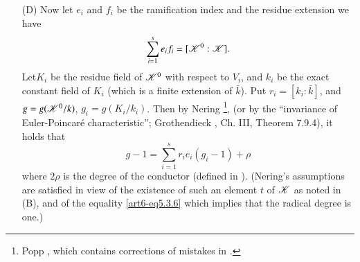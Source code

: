 \begin{itemize}
\item[(D)] Now let $e_i$ and $f_i$ be the ramification index and the residue extension we have
\begin{equation}
\sum\limits^s_{i=1} e_i f_i = [\mathscr{K}^0: \mathscr{K}]. \label{art6-eq5.3.6}
\end{equation}
Let\pageoriginale $K_i$ be the residue field of $\mathscr{K}^0$ with respect to $V_i$, and $k_i$ be the exact constant field of $K_i$ (which is a finite extension of $\bar{k}$). Put $r_i = [k_i : \bar{k}]$, and $g = g(\mathscr{K}^0/k)$, $g_i = g (K_i/ k_i)$. Then by Nering \cite{art6-key14}\footnote{\cf Popp \cite{art6-key20}, which contains corrections of mistakes in \cite{art6-key14}.}, (or by the ``invariance of Euler-Poincar\'e characteristic''; Grothendieck \cite{art6-key4}, Ch. III, Theorem 7.9.4), it holds that
\begin{equation}
g - 1 = \sum\limits^s_{i=1} r_i e_i (g_i - 1 ) + \rho 
\label{art6-eq5.3.7}
\end{equation}
where $2 \rho $ is the degree of the conductor (defined in \cite{art6-key14}). (Nering's assumptions are satisfied in view of the existence of such an element $t$ of $\mathscr{K}$ as noted in (B), and of the equality \eqref{art6-eq5.3.6} which implies that the radical degree is one.)
\end{itemize}

